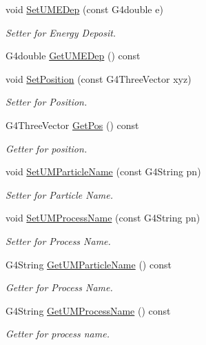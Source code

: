 \begin{DoxyCompactItemize}
\item 
void \hyperlink{classUMHit_af0222028e4ccfb5aa14ea5956ab8e6b7}{Set\+U\+M\+E\+Dep} (const G4double e)
\begin{DoxyCompactList}\small\item\em Setter for Energy Deposit. \end{DoxyCompactList}\item 
G4double \hyperlink{classUMHit_a972fd7fa5472ed40803bc78f90177c74}{Get\+U\+M\+E\+Dep} () const 
\item 
void \hyperlink{classUMHit_a782a87ef10c335a5e3046cb096f183f1}{Set\+Position} (const G4\+Three\+Vector xyz)
\begin{DoxyCompactList}\small\item\em Setter for Position. \end{DoxyCompactList}\item 
G4\+Three\+Vector \hyperlink{classUMHit_ad4fa003468a310edb749395e3dbb78c1}{Get\+Pos} () const 
\begin{DoxyCompactList}\small\item\em Getter for position. \end{DoxyCompactList}\item 
void \hyperlink{classUMHit_a1f872ac3231beb480095f417085d9205}{Set\+U\+M\+Particle\+Name} (const G4\+String pn)
\begin{DoxyCompactList}\small\item\em Setter for Particle Name. \end{DoxyCompactList}\item 
void \hyperlink{classUMHit_af922d50470b941d27f60668242885784}{Set\+U\+M\+Process\+Name} (const G4\+String pn)
\begin{DoxyCompactList}\small\item\em Setter for Process Name. \end{DoxyCompactList}\item 
G4\+String \hyperlink{classUMHit_ae91e909b64f2059f37b1068b594a25c6}{Get\+U\+M\+Particle\+Name} () const 
\begin{DoxyCompactList}\small\item\em Getter for Process Name. \end{DoxyCompactList}\item 
G4\+String \hyperlink{classUMHit_ade4194ef36b9553b403c60d31f031fdf}{Get\+U\+M\+Process\+Name} () const 
\begin{DoxyCompactList}\small\item\em Getter for process name. \end{DoxyCompactList}\item 

\end{DoxyCompactItemize}
